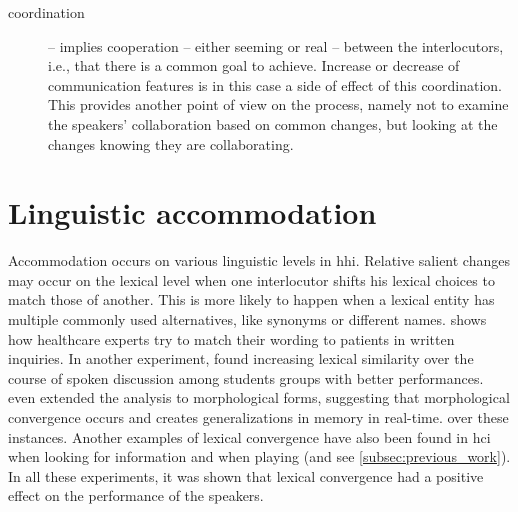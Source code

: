 \begin{description}
	\item[coordination] -- implies cooperation -- either seeming or real -- between the interlocutors, i.e., that there is a common goal to achieve.
	Increase or decrease of communication features is in this case a side of effect of this coordination.
	This provides another point of view on the process, namely not to examine the speakers' collaboration based on common changes, but looking at the changes knowing they are collaborating.
	
\end{description}

\section{Linguistic accommodation}
\label{sec:linguistic_accommodation}

Accommodation occurs on various linguistic levels in \ac{hhi}.
Relative salient changes may occur on the lexical level when one interlocutor shifts his lexical choices to match those of another.
This is more likely to happen when a lexical entity has multiple commonly used alternatives, like synonyms or different names.
\citet{Jucks2008lexical} shows how healthcare experts try to match their wording to patients in written inquiries.
In another experiment, \citet{Friedberg2012lexical} found increasing lexical similarity over the course of spoken discussion among students groups with better performances.
\citet{Racz2020morphological} even extended the analysis to morphological forms, suggesting that morphological convergence occurs and creates generalizations in memory in real-time.
over these instances.
Another examples of lexical convergence have also been found in \ac{hci} when looking for information \citep{Lopes2013lexical} and when playing \citep{Bergqvist2020nontrivial} (and see \cref{subsec:previous_work}).
In all these experiments, it was shown that lexical convergence had a positive effect on the performance of the speakers.

